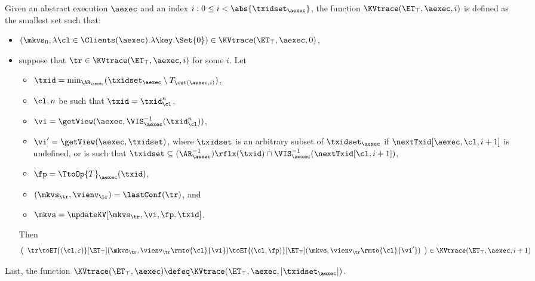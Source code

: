 \begin{definition}
\label{def:aexec2kvtrace}
Given an abstract execution $\aexec$ and an index $i : 0 \leq i < \abs{\txidset_\aexec}$, 
the function $\KVtrace(\ET_{\top}, \aexec, i)$ is defined as the smallest set such that:
\begin{itemize}
\item 
$(\mkvs_{0}, \lambda \cl \in \Clients(\aexec). \lambda \key.\Set{0}) \in \KVtrace(\ET_{\top}, \aexec, 0)$, 
\item suppose that $\tr \in \KVtrace(\ET_{\top}, \aexec, i)$ for some $i$.  
Let
\begin{itemize} 
\item $\txid = \min_{\AR_{\aexec}}(\txidset_{\aexec} \setminus T_{\cut(\aexec, i)})$, 
\item  $\cl, n$ be such that $\txid = \txid_{\cl}^{n}$, 
\item  $\vi = \getView(\aexec, \VIS^{-1}_{\aexec}(\txid_{\cl}^{n}))$, 
\item $\vi' = \getView(\aexec, \txidset)$, where $\txidset$ is an arbitrary subset of $\txidset_{\aexec}$ if 
$\nextTxid[\aexec, \cl, i+1]$ is undefined, or is such that 
$\txidset \subseteq (\AR_{\aexec}^{-1})\rflx(\txid) \cap \VIS^{-1}_{\aexec}(\nextTxid[\cl, i+1])$, 
\item $\fp = \TtoOp{T}_{\aexec}(\txid)$, 
\item $(\mkvs_{\tr}, \vienv_{\tr}) = \lastConf(\tr)$, and
\item $\mkvs = \updateKV[\mkvs_{\tr}, \vi, \fp, \txid]$.
\end{itemize}
Then
\[
\left( 
\begin{array}{l}
\tr \toET{(\cl, \varepsilon)}[\ET_{\top}] (\mkvs_{\tr}, \vienv_{\tr}\rmto{\cl}{\vi}) 
\toET{(\cl, \fp)}[\ET_{\top}] (\mkvs, \vienv_{\tr}\rmto{\cl}{\vi'}) 
\end{array}
\right) \in \KVtrace(\ET_{\top}, \aexec, i+1)
\]
\end{itemize}
Last, the function $\KVtrace(\ET_{\top}, \aexec) \defeq \KVtrace(\ET_{\top}, \aexec, \lvert \txidset_\aexec \rvert)$.
\end{definition}

